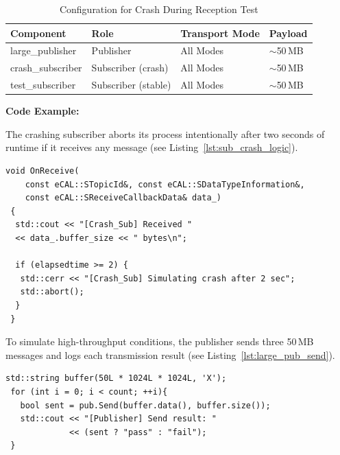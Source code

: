 \begin{table}[H]
	\centering
	\begin{tabular}{@{}llll@{}}
		\toprule
		\textbf{Component} & \textbf{Role}       & \textbf{Transport Mode} & \textbf{Payload} \\
		\midrule
		large\_publisher   & Publisher           & All Modes               & $\sim$50\,MB     \\
		crash\_subscriber  & Subscriber (crash)  & All Modes               & $\sim$50\,MB     \\
		test\_subscriber   & Subscriber (stable) & All Modes               & $\sim$50\,MB     \\
		\bottomrule
	\end{tabular}
	\caption{Configuration for Crash During Reception Test}
	\label{tab:sub_crash_receive}
\end{table}

\vspace{0.5em}
\textbf{Code Example:}

\vspace{0.4em}
The crashing subscriber aborts its process intentionally after two seconds of runtime if it receives any message (see Listing~\ref{lst:sub_crash_logic}).

\begin{lstlisting}[style=cppstyle, caption={Crash condition inside subscriber receive callback}, label={lst:sub_crash_logic}, captionpos=b]
 void OnReceive(
    const eCAL::STopicId&, const eCAL::SDataTypeInformation&,
    const eCAL::SReceiveCallbackData& data_)
 {
  std::cout << "[Crash_Sub] Received " 
  << data_.buffer_size << " bytes\n";
    		
  if (elapsedtime >= 2) {
   std::cerr << "[Crash_Sub] Simulating crash after 2 sec";
   std::abort();
  }
 }

\end{lstlisting}

To simulate high-throughput conditions, the publisher sends three 50\,MB messages and logs each transmission result (see Listing~\ref{lst:large_pub_send}).

\begin{lstlisting}[style=cppstyle, caption={Large message publisher with send confirmation}, label={lst:large_pub_send}, captionpos=b]
 std::string buffer(50L * 1024L * 1024L, 'X');
 for (int i = 0; i < count; ++i){
   bool sent = pub.Send(buffer.data(), buffer.size());
   std::cout << "[Publisher] Send result: " 
             << (sent ? "pass" : "fail");
 }
\end{lstlisting}

